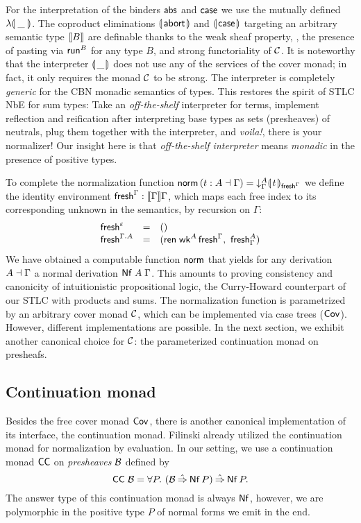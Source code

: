 \documentclass[sigconf,screen,fleqn]{acmart} %
\begin{document}
For the interpretation of the binders $\mathsf{abs}$ and $\mathsf{case}$ we use the
mutually defined $\fden{\_}$.
The coproduct eliminations $\llparenthesis\kern0.3ex\mathsf{abort}\kern0.3ex\rrparenthesis$ and $\llparenthesis\kern0.3ex\mathsf{case}\kern0.3ex\rrparenthesis$
targeting an arbitrary semantic type $\mathopen{{[\kern-0.14em[}} B \mathclose{{]\kern-0.14em]}}$ are definable thanks to
the weak sheaf property, \ie, the presence of pasting via $\mathsf{run}^B$
for any type $B$, and strong functoriality of $\mathcal{C}$.
It is noteworthy that the interpreter $\llparenthesis\kern0.3ex\_\kern0.3ex\rrparenthesis$ does not use any of
the services of the cover monad; in fact, it only requires the monad
$\mathcal{C}$ to be strong.  The interpreter is completely \emph{generic} for
the CBN monadic semantics of types.  This restores the spirit of STLC
NbE for sum types:  Take an \emph{off-the-shelf} interpreter for terms,
implement reflection and reification after interpreting base types as sets
(presheaves) of neutrals, plug them together with the interpreter, and
\emph{voila!}, there is your normalizer!
Our insight here is that \emph{off-the-shelf interpreter} means
\emph{monadic} in the presence of positive types.

To complete the normalization function
$\mathsf{norm}\,(t : A \dashv \Gamma) = \mathord{\downarrow_{\Gamma}^{A}} \llparenthesis\kern0.3ext\kern0.3ex\rrparenthesis_{\mathsf{fresh}^{\Gamma}}$
we define the identity environment $\mathsf{fresh}^{\Gamma} : \mathopen{{[\kern-0.14em[}} \Gamma \mathclose{{]\kern-0.14em]}} \Gamma$,
which maps each free index to its corresponding unknown in the
semantics, by recursion on $\Gamma$:
\[
\begin{array}{lcl}
  \mathsf{fresh}^{\varepsilon} & = & () \\
  \mathsf{fresh}^{\Gamma.A} & = & (\mathsf{ren}\;\mathsf{wk}^A\,\mathsf{fresh}^{\Gamma}, \  \mathsf{fresh}^A_\Gamma)\\
\end{array}
\]
We have obtained a computable function $\mathsf{norm}$ that yields for any
derivation $A \dashv \Gamma$ a normal derivation $\mathsf{Nf}\;A\;\Gamma$.
This amounts to proving
consistency and canonicity of intuitionistic propositional logic, the
Curry-Howard counterpart of our STLC with products and sums.
The normalization function is parametrized by an arbitrary cover monad
$\mathcal{C}$, which can be implemented via case trees ($\mathsf{Cov}^{}$).  However,
different implementations are possible.  In the next section, we exhibit
another canonical choice for $\mathcal{C}$: the parameterized continuation monad on presheafs.

\subsection{Continuation monad}

Besides the free cover monad $\mathsf{Cov}^{}$, there is another canonical
implementation of its interface, the continuation monad.
Filinski
\cite[Section~5.4]{filinski:semaccounttdpe}
\cite[Section~3.2]{filinski:tlca01}
already utilized the continuation monad for
normalization by evaluation.
In our setting, we use a continuation monad $\mathsf{CC}$ on \emph{presheaves}
$\mathcal{B}$ defined by
\[
  \CC\;\B = \forall P.\ (\B \hatto \tNf\,P) \hatto \tNf\,P
  .
\]
The answer type of this continuation monad is always $\mathsf{Nf}$, however,
we are polymorphic in the positive type $P$ of normal forms we emit in
the end.%
\end{document}
